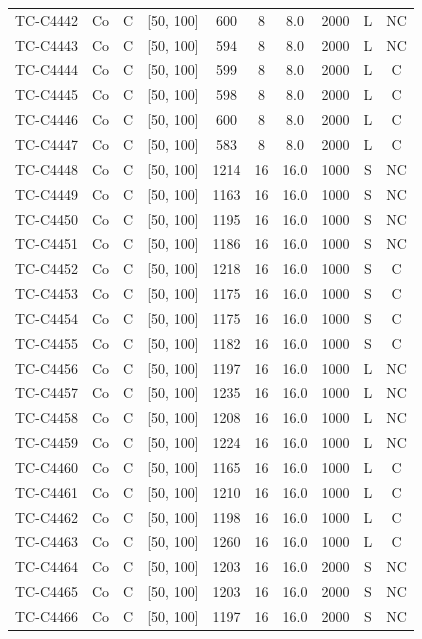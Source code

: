 \begin{longtable}{lccccccccc}
TC-C4442 & Co & C & [50, 100] & 600 & 8 & 8.0 & 2000 & L & NC \\
TC-C4443 & Co & C & [50, 100] & 594 & 8 & 8.0 & 2000 & L & NC \\
TC-C4444 & Co & C & [50, 100] & 599 & 8 & 8.0 & 2000 & L & C \\
TC-C4445 & Co & C & [50, 100] & 598 & 8 & 8.0 & 2000 & L & C \\
TC-C4446 & Co & C & [50, 100] & 600 & 8 & 8.0 & 2000 & L & C \\
TC-C4447 & Co & C & [50, 100] & 583 & 8 & 8.0 & 2000 & L & C \\
TC-C4448 & Co & C & [50, 100] & 1214 & 16 & 16.0 & 1000 & S & NC \\
TC-C4449 & Co & C & [50, 100] & 1163 & 16 & 16.0 & 1000 & S & NC \\
TC-C4450 & Co & C & [50, 100] & 1195 & 16 & 16.0 & 1000 & S & NC \\
TC-C4451 & Co & C & [50, 100] & 1186 & 16 & 16.0 & 1000 & S & NC \\
TC-C4452 & Co & C & [50, 100] & 1218 & 16 & 16.0 & 1000 & S & C \\
TC-C4453 & Co & C & [50, 100] & 1175 & 16 & 16.0 & 1000 & S & C \\
TC-C4454 & Co & C & [50, 100] & 1175 & 16 & 16.0 & 1000 & S & C \\
TC-C4455 & Co & C & [50, 100] & 1182 & 16 & 16.0 & 1000 & S & C \\
TC-C4456 & Co & C & [50, 100] & 1197 & 16 & 16.0 & 1000 & L & NC \\
TC-C4457 & Co & C & [50, 100] & 1235 & 16 & 16.0 & 1000 & L & NC \\
TC-C4458 & Co & C & [50, 100] & 1208 & 16 & 16.0 & 1000 & L & NC \\
TC-C4459 & Co & C & [50, 100] & 1224 & 16 & 16.0 & 1000 & L & NC \\
TC-C4460 & Co & C & [50, 100] & 1165 & 16 & 16.0 & 1000 & L & C \\
TC-C4461 & Co & C & [50, 100] & 1210 & 16 & 16.0 & 1000 & L & C \\
TC-C4462 & Co & C & [50, 100] & 1198 & 16 & 16.0 & 1000 & L & C \\
TC-C4463 & Co & C & [50, 100] & 1260 & 16 & 16.0 & 1000 & L & C \\
TC-C4464 & Co & C & [50, 100] & 1203 & 16 & 16.0 & 2000 & S & NC \\
TC-C4465 & Co & C & [50, 100] & 1203 & 16 & 16.0 & 2000 & S & NC \\
TC-C4466 & Co & C & [50, 100] & 1197 & 16 & 16.0 & 2000 & S & NC \\

\end{longtable}
